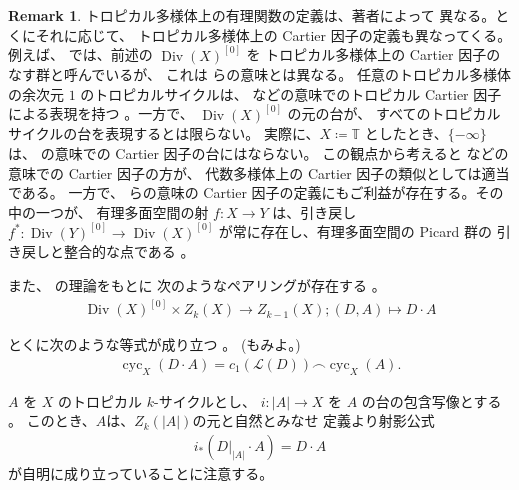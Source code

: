 \documentclass[a4paper,dvipdfmx,reqno,12pt]{amsart}
\theoremstyle{definition}
\newtheorem{remark}[theorem]{Remark}
\newcommand{\deq}{\coloneqq}
\newcommand{\opn}[1]{\operatorname{#1}}
\numberwithin{equation}{section}
\begin{document}
\begin{remark}
トロピカル多様体上の有理関数の定義は、著者によって
異なる。とくにそれに応じて、
トロピカル多様体上の Cartier 因子の定義も異なってくる。
例えば、\cite{MR3894860,MR4637248}
では、前述の $\opn{Div}(X)^{[0]}$ を
トロピカル多様体上の Cartier 因子のなす群と呼んでいるが、
これは \cite{demedrano2023chern} らの意味とは異なる。
任意のトロピカル多様体の余次元 $1$ のトロピカルサイクルは、
\cite{shaw2015tropical,demedrano2023chern}
などの意味でのトロピカル Cartier 因子による表現を持つ
\cite[Proposition 3.27]{shaw2015tropical}。一方で、
$\opn{Div}(X)^{[0]}$ の元の台が、
すべてのトロピカルサイクルの台を表現するとは限らない。
実際に、$X\deq \mathbb{T}$ としたとき、$\{-\infty\}$
は、\cite{MR3894860,MR4637248} の意味での
Cartier 因子の台にはならない。
この観点から考えると \cite{demedrano2023chern} などの
意味での Cartier 因子の方が、
代数多様体上の Cartier 因子の類似としては適当である。
一方で、\cite{MR3894860,MR4637248} らの意味の Cartier 
因子の定義にもご利益が存在する。その中の一つが、
有理多面空間の射 $f\colon X\to Y$ は、引き戻し
$f^{*}\colon \opn{Div}(Y)^{[0]} \to \opn{Div}(X)^{[0]}$
が常に存在し、有理多面空間の Picard 群の
引き戻しと整合的な点である
\cite[Propoisition 3.15]{MR4637248}。
\end{remark}

また、\cite{MR2591823} の理論をもとに
次のようなペアリングが存在する
\cite[]{MR4637248}。
\begin{align}
\label{equation-divisor-pairing}
\opn{Div}(X)^{[0]}\times Z_{k}(X)\to Z_{k-1}(X);
(D,A) \mapsto D\cdot A
\end{align}

とくに次のような等式が成り立つ
\cite[Proposition 5.12]{MR4637248}。
(\cite[Theorem 4.15]{MR3894860}もみよ。)
\begin{align}
\opn{cyc}_X(D\cdot A)=c_1(\mathcal{L}(D))
\frown \opn{cyc}_X(A).
\end{align}

$A$ を $X$ のトロピカル $k$-サイクルとし、
$i\colon |A|\to X$ を $A$ の台の包含写像とする
\cite[Definition 3.5]{MR4637248}。
このとき、$A$は、$Z_k(|A|)$の元と自然とみなせ
定義より射影公式
\begin{align}
i_*(D|_{|A|}\cdot A)=D\cdot A
\end{align}
が自明に成り立っていることに注意する。
\end{document}
